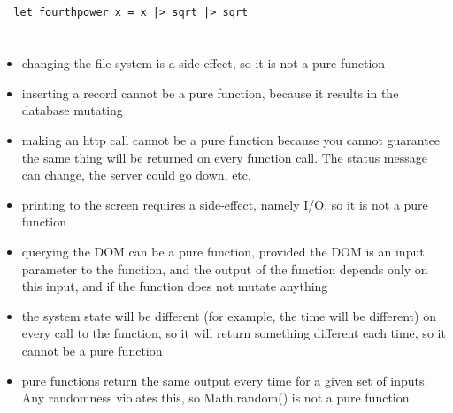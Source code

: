 \documentclass[letterpaper]{article}
\begin{document}
\subsection{}
\begin{verbatim}
  let fourthpower x = x |> sqrt |> sqrt
\end{verbatim}

\section{}
\begin{itemize}
  \item changing the file system is a side effect, so it is not a pure function
  \item inserting a record cannot be a pure function, because it results in the
    database mutating
  \item making an http call cannot be a pure function because you cannot
    guarantee the same thing will be returned on every function call. The status
    message can change, the server could go down, etc.
  \item printing to the screen requires a side-effect, namely I/O, so it is not
    a pure function
  \item querying the DOM can be a pure function, provided the DOM is an input
    parameter to the function, and the output of the function depends only on
    this input, and if the function does not mutate anything
  \item the system state will be different (for example, the time will be
    different) on every call to the function, so it
    will return something different each time, so it cannot be a pure function
  \item pure functions return the same output every time for a given set of
    inputs. Any randomness violates this, so Math.random() is not a pure
    function
\end{itemize}

\section{}
\inputminted[]{rust}{7.rs}

\section{}
\inputminted[]{rust}{8.rs}
\end{document}
